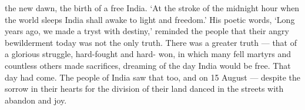 \begin{multicols}{2}
the new dawn, the birth of a free India. `At the stroke of the midnight hour when the world sleeps India shall awake to light and freedom.' His poetic words, `Long years ago, we made a tryst with destiny,' reminded the people that their angry bewilderment today was not the only truth. There was a greater truth --- that of a glorious struggle, hard-fought and hard- won, in which many fell martyrs and countless others made sacrifices, dreaming of the day India would be free. That day had come. The people of India saw that too, and on 15 August --- despite the sorrow in their hearts for the division of their land danced in the streets with abandon and joy.
\end{multicols}
